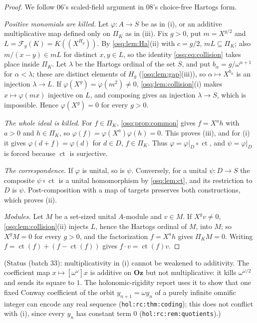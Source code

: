 \documentclass[11pt,letterpaper]{article}
\numberwithin{equation}{section}
\theoremstyle{definition}
\theoremstyle{remark}
\theoremstyle{plain}
\newcommand{\Oz}{\mathbf{Oz}}
\newcommand{\FF}{\mathscr F}         %
\newcommand{\hahn}[2]{#1(\!(X^{#2})\!)}
\newcommand{\ct}{\operatorname{ct}}
\begin{document}
\begin{proof}
We follow 06's scaled-field argument in 08's choice-free Hartogs form.

\emph{Positive monomials are killed.} Let $\varphi:A\to S$ be as in (i), or an additive
multiplicative map defined only on $\Pi_K$ as in (iii). Fix $g>0$, put $m=X^{g/2}$ and
$L=\FF_g(K)=\hahn K{H_g}$. By \cref{osq:lem:Ha}(ii) with $c=g/2$, $mL\subseteq\Pi_K$;
also $m/(x-y)\in mL$ for distinct $x,y\in L$, so the identity \eqref{osq:eq:collision}
takes place inside $\Pi_K$. Let $\lambda$ be the Hartogs ordinal of the set $S$, and put
$b_\alpha=g/\omega^{\alpha+1}$ for $\alpha<\lambda$; these are distinct elements of $H_g$
(\cref{osq:lem:gap}(iii)), so $\alpha\mapsto X^{b_\alpha}$ is an injection
$\lambda\to L$. If $\varphi(X^g)=\varphi(m^2)\ne0$, \cref{osq:lem:collision}(i) makes
$x\mapsto\varphi(mx)$ injective on $L$, and composing gives an injection $\lambda\to S$,
which is impossible. Hence $\varphi(X^g)=0$ for every $g>0$.

\emph{The whole ideal is killed.} For $f\in\Pi_K$, \cref{osq:prop:common} gives
$f=X^ah$ with $a>0$ and $h\in\Pi_K$, so $\varphi(f)=\varphi(X^a)\varphi(h)=0$. This proves
(iii), and for (i) it gives $\varphi(d+f)=\varphi(d)$ for $d\in D$, $f\in\Pi_K$. Thus
$\varphi=\varphi|_D\circ\ct$, and $\psi=\varphi|_D$ is forced because $\ct$ is surjective.

\emph{The correspondence.} If $\varphi$ is unital, so is $\psi$. Conversely, for a unital
$\psi:D\to S$ the composite $\psi\circ\ct$ is a unital homomorphism by \cref{osq:lem:ct},
and its restriction to $D$ is $\psi$. Post-composition with a map of targets preserves both
constructions, which proves (ii).

\emph{Modules.} Let $M$ be a set-sized unital $A$-module and $v\in M$. If $X^gv\ne0$,
\cref{osq:lem:collision}(ii) injects $L$, hence the Hartogs ordinal of $M$, into $M$;
so $X^gM=0$ for every $g>0$, and the factorization $f=X^ah$ gives $\Pi_KM=0$. Writing
$f=\ct(f)+(f-\ct(f))$ gives $f\cdot v=\ct(f)v$.
\end{proof}

(Status (batch 33): multiplicativity in (i) cannot be weakened to additivity. The coefficient map $x\mapsto[\omega^\omega]x$ is additive on $\Oz$ but
not multiplicative: it kills $\omega^{\omega/2}$ and sends its square to $1$. The holonomic-rigidity report \cite{RepoHol} uses it to show that one fixed
Conway coefficient of the orbit $y_{n+1}=\omega y_n$ of a purely infinite omnific integer can encode any real sequence
(\nolinkurl{hol:rc:thm:coding}); this does not conflict with (i), since every $y_n$ has constant term $0$ (\nolinkurl{hol:rc:rem:quotients}).)
\end{document}
